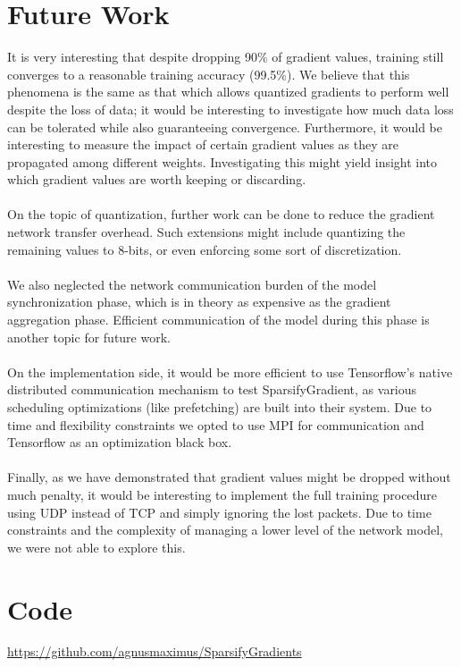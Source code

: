 \documentclass[10pt]{article}
\begin{document}
\section{Future Work}
\label{sec-7}

It is very interesting that despite dropping 90\% of gradient values,
training still converges to a reasonable training accuracy (99.5\%). We
believe that this phenomena is the same as that which allows quantized
gradients to perform well despite the loss of data; it would be
interesting to investigate how much data loss can be tolerated while
also guaranteeing convergence. Furthermore, it would be interesting to
measure the impact of certain gradient values as they are propagated
among different weights. Investigating this might yield insight into which gradient values are worth keeping or discarding.
\\
\\
On the topic of quantization, further work can be done to reduce the
gradient network transfer overhead. Such extensions might include
quantizing the remaining values to 8-bits, or even enforcing some sort
of discretization.
\\
\\
We also neglected the network communication burden of the model
synchronization phase, which is in theory as expensive as the gradient
aggregation phase. Efficient communication of the model during this
phase is another topic for future work.
\\
\\
On the implementation side, it would be more efficient to use Tensorflow's native
distributed communication mechanism to test SparsifyGradient, as various scheduling optimizations (like prefetching)
are built into their system. Due to time and flexibility constraints we
opted to use MPI for communication and Tensorflow as an optimization black box.
\\
\\
Finally, as we have demonstrated that gradient values might be dropped
without much penalty, it would be interesting to implement the full
training procedure using UDP instead of TCP and simply ignoring the
lost packets. Due to time constraints and the complexity of managing a
lower level of the network model, we were not able to explore this.

\section{Code}
\label{sec-8}
\url{https://github.com/agnusmaximus/SparsifyGradients}
\end{document}
